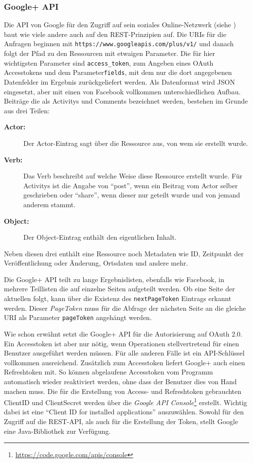 \subsubsection{Google+ API} %
\label{ssub:google_api}

Die API von Google für den Zugriff auf sein soziales Online-Netzwerk (siehe \cite{GooglePlusApi}) baut wie viele andere auch auf den REST-Prinzipien auf. Die URIs für die Anfragen beginnen mit \texttt{https://www.googleapis.com/plus/v1/} und danach folgt der Pfad zu den Ressourcen mit etwaigen Parameter. Die für hier wichtigsten Parameter sind \texttt{access\_token}, zum Angeben eines OAuth Accesstokens und dem Parameter\texttt{fields}, mit dem nur die dort angegebenen Datenfelder im Ergebnis zurückgeliefert werden. Als Datenformat wird JSON eingesetzt, aber mit einen von Facebook vollkommen unterschiedlichen Aufbau. Beiträge die als Activitys und Comments bezeichnet werden, bestehen im Grunde aus drei Teilen:

\begin{description}
    \item[\textbf{Actor:}] Der Actor-Eintrag sagt über die Ressource aus, von wem sie erstellt wurde. 
    \item[\textbf{Verb:}] Das Verb beschreibt auf welche Weise diese Ressource erstellt wurde. Für Activitys ist die Angabe von \enquote{post}, wenn ein Beitrag vom Actor selber geschrieben oder \enquote{share}, wenn dieser nur geteilt wurde und von jemand anderem stammt. 
    \item[\textbf{Object:}] Der Object-Eintrag enthält den eigentlichen Inhalt.
\end{description}

Neben diesen drei enthält eine Ressource noch Metadaten wie ID, Zeitpunkt der Veröffentlichung oder Änderung, Ortsdaten und andere mehr.

Die Google+ API teilt zu lange Ergebnislisten, ebenfalls wie Facebook, in mehrere Teillisten die auf einzelne Seiten aufgeteilt werden. Ob eine Seite der aktuellen folgt, kann über die Existenz des \texttt{nextPageToken} Eintrags erkannt werden. Dieser \emph{PageToken} muss für die Abfrage der nächsten Seite an die gleiche URI als Parameter \texttt{pageToken} angehängt werden. 

Wie schon erwähnt setzt die Google+ API für die Autorisierung auf OAuth 2.0. Ein Accesstoken ist aber nur nötig, wenn Operationen stellvertretend für einen Benutzer ausgeführt werden müssen. Für alle anderen Fälle ist ein API-Schlüssel vollkommen ausreichend. Zusätzlich zum Accesstoken liefert Google+ auch einen Refreshtoken mit. So können abgelaufene Accesstoken vom Programm automatisch wieder reaktiviert werden, ohne dass der Benutzer dies von Hand machen muss. Die für die Erstellung von Access- und Refreshtoken gebrauchten ClientID und ClientSecret werden über die \emph{Google API Console}\footnote{\url{https://code.google.com/apis/console}} erstellt. Wichtig dabei ist eine \enquote{Client ID for installed applications} auszuwählen. Sowohl für den Zugriff auf die REST-API, als auch für die Erstellung der Token, stellt Google eine Java-Bibliothek zur Verfügung. 

